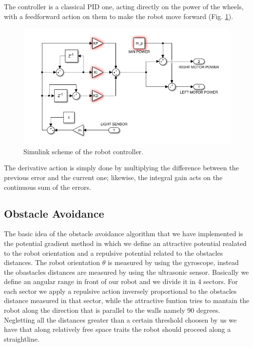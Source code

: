 \documentclass[a4paper,11pt,oneside]{book}
\begin{document}
		The controller is a classical PID one, acting directly on the power of the wheels, with a feedforward action on them to make the robot move forward (Fig. \ref{fig:PID_fig.png}).
		\begin{figure} [H]
			\includegraphics{figs/PID_fig.png}
			\caption{Simulink scheme of the robot controller.}\label{fig:PID_fig.png}
		\end{figure}
		
		The derivative action is simply done by multiplying the difference between the previous error and the current one; likewise, the integral gain acts on the continuous sum of the errors.
		
		
		\subsection {Obstacle Avoidance}
		
	
		\begin{center}	
		\end{center}
	
		
		The basic idea of the obstacle avoidance algorithm that we have implemented is the potential gradient method in which we define an attractive potential realated to the robot orientation and a repulsive potential related to the obstacles distances. The robot orientation $\theta$ is measured by using the gyroscope, instead the obastacles distances are measured by using the ultrasonic sensor. Basically we define an angular range in front of our robot and we divide it in 4 sectors. For each sector we apply a repulsive action inversely proportional to the obstacles distance measured in that sector, while the attractive funtion tries to mantain the robot along the direction that is parallel to the walls namely 90 degrees. Negletting all the distances greater than a certain threshold choosen by us we have that along relatively free space traits the robot should proceed along a straightline.\\
		
\end{document}
